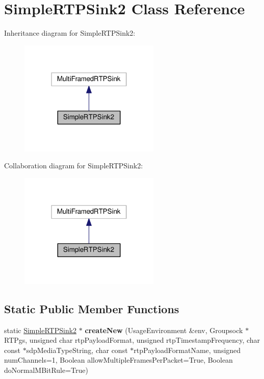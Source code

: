 \hypertarget{classSimpleRTPSink2}{}\section{Simple\+R\+T\+P\+Sink2 Class Reference}
\label{classSimpleRTPSink2}


Inheritance diagram for Simple\+R\+T\+P\+Sink2\+:\nopagebreak
\begin{figure}[H]
\begin{center}
\leavevmode
\includegraphics[width=190pt]{classSimpleRTPSink2__inherit__graph}
\end{center}
\end{figure}


Collaboration diagram for Simple\+R\+T\+P\+Sink2\+:\nopagebreak
\begin{figure}[H]
\begin{center}
\leavevmode
\includegraphics[width=190pt]{classSimpleRTPSink2__coll__graph}
\end{center}
\end{figure}
\subsection*{Static Public Member Functions}
\begin{DoxyCompactItemize}
\item 
static \hyperlink{classSimpleRTPSink2}{Simple\+R\+T\+P\+Sink2} $\ast$ {\bfseries create\+New} (Usage\+Environment \&env, Groupsock $\ast$R\+T\+Pgs, unsigned char rtp\+Payload\+Format, unsigned rtp\+Timestamp\+Frequency, char const $\ast$sdp\+Media\+Type\+String, char const $\ast$rtp\+Payload\+Format\+Name, unsigned num\+Channels=1, Boolean allow\+Multiple\+Frames\+Per\+Packet=True, Boolean do\+Normal\+M\+Bit\+Rule=True)\hypertarget{classSimpleRTPSink2_a773baeb496c50b41d16f92af789e6462}{}\label{classSimpleRTPSink2_a773baeb496c50b41d16f92af789e6462}

\end{DoxyCompactItemize}
